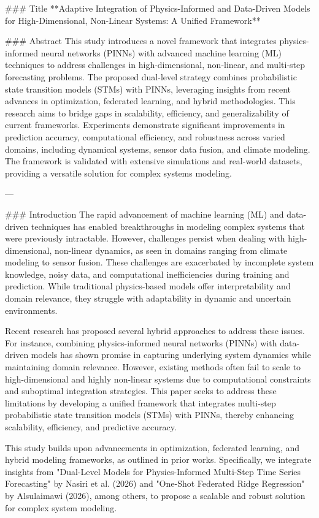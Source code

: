 ### Title
**Adaptive Integration of Physics-Informed and Data-Driven Models for High-Dimensional, Non-Linear Systems: A Unified Framework**

### Abstract
This study introduces a novel framework that integrates physics-informed neural networks (PINNs) with advanced machine learning (ML) techniques to address challenges in high-dimensional, non-linear, and multi-step forecasting problems. The proposed dual-level strategy combines probabilistic state transition models (STMs) with PINNs, leveraging insights from recent advances in optimization, federated learning, and hybrid methodologies. This research aims to bridge gaps in scalability, efficiency, and generalizability of current frameworks. Experiments demonstrate significant improvements in prediction accuracy, computational efficiency, and robustness across varied domains, including dynamical systems, sensor data fusion, and climate modeling. The framework is validated with extensive simulations and real-world datasets, providing a versatile solution for complex systems modeling.

---

### Introduction
The rapid advancement of machine learning (ML) and data-driven techniques has enabled breakthroughs in modeling complex systems that were previously intractable. However, challenges persist when dealing with high-dimensional, non-linear dynamics, as seen in domains ranging from climate modeling to sensor fusion. These challenges are exacerbated by incomplete system knowledge, noisy data, and computational inefficiencies during training and prediction. While traditional physics-based models offer interpretability and domain relevance, they struggle with adaptability in dynamic and uncertain environments.

Recent research has proposed several hybrid approaches to address these issues. For instance, combining physics-informed neural networks (PINNs) with data-driven models has shown promise in capturing underlying system dynamics while maintaining domain relevance. However, existing methods often fail to scale to high-dimensional and highly non-linear systems due to computational constraints and suboptimal integration strategies. This paper seeks to address these limitations by developing a unified framework that integrates multi-step probabilistic state transition models (STMs) with PINNs, thereby enhancing scalability, efficiency, and predictive accuracy.

This study builds upon advancements in optimization, federated learning, and hybrid modeling frameworks, as outlined in prior works. Specifically, we integrate insights from "Dual-Level Models for Physics-Informed Multi-Step Time Series Forecasting" by Nasiri et al. (2026) and "One-Shot Federated Ridge Regression" by Alsulaimawi (2026), among others, to propose a scalable and robust solution for complex system modeling.


